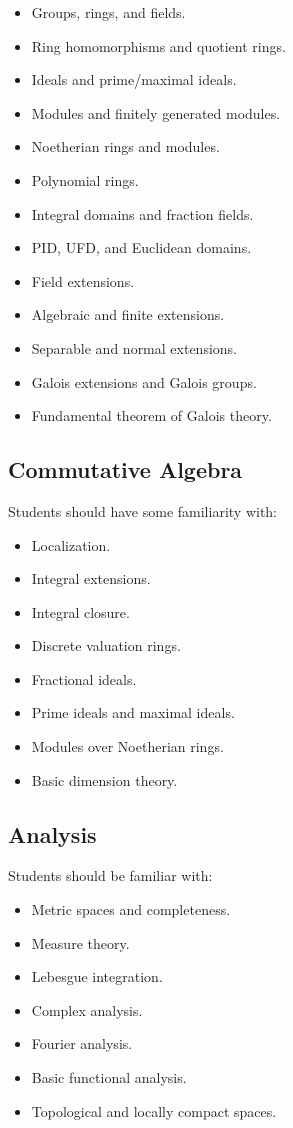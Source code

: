 \documentclass[11pt]{article}
\begin{document}
\begin{itemize}
    \item Groups, rings, and fields.
    \item Ring homomorphisms and quotient rings.
    \item Ideals and prime/maximal ideals.
    \item Modules and finitely generated modules.
    \item Noetherian rings and modules.
    \item Polynomial rings.
    \item Integral domains and fraction fields.
    \item PID, UFD, and Euclidean domains.
    \item Field extensions.
    \item Algebraic and finite extensions.
    \item Separable and normal extensions.
    \item Galois extensions and Galois groups.
    \item Fundamental theorem of Galois theory.
\end{itemize}

\subsection{Commutative Algebra}

Students should have some familiarity with:

\begin{itemize}
    \item Localization.
    \item Integral extensions.
    \item Integral closure.
    \item Discrete valuation rings.
    \item Fractional ideals.
    \item Prime ideals and maximal ideals.
    \item Modules over Noetherian rings.
    \item Basic dimension theory.
\end{itemize}

\subsection{Analysis}

Students should be familiar with:

\begin{itemize}
    \item Metric spaces and completeness.
    \item Measure theory.
    \item Lebesgue integration.
    \item Complex analysis.
    \item Fourier analysis.
    \item Basic functional analysis.
    \item Topological and locally compact spaces.
\end{itemize}
\end{document}
